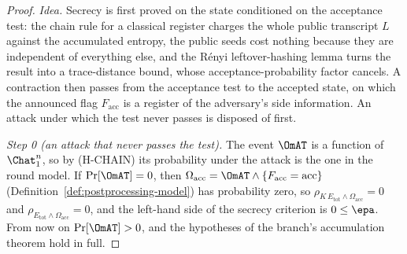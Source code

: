 \begin{proof}
\emph{Idea.} Secrecy is first proved on the state conditioned on the
acceptance test: the chain rule for a classical register charges the whole
public transcript $L$ against the accumulated entropy, the public seeds cost
nothing because they are independent of everything else, and the R\'enyi
leftover-hashing lemma turns the result into a trace-distance bound, whose
acceptance-probability factor cancels. A contraction then passes from the
acceptance test to the accepted state, on which the announced flag
$F_{\mathrm{acc}}$ is a register of the adversary's side information. An
attack under which the test never passes is disposed of first.

\emph{Step 0 (an attack that never passes the test).} The event $\OmAT$ is
a function of $\Chat_1^n$, so by (H-CHAIN) its probability under the
attack is the one in the round model. If $\Pr[\OmAT]=0$, then
$\Omega_{\mathrm{acc}}=\OmAT\wedge\{F_{\mathrm{acc}}=\mathrm{acc}\}$
(Definition~\ref{def:postprocessing-model}) has probability zero, so
$\rho_{K\,E_{\mathrm{tot}}\wedge\Omega_{\mathrm{acc}}}=0$ and
$\rho_{E_{\mathrm{tot}}\wedge\Omega_{\mathrm{acc}}}=0$, and the left-hand
side of the secrecy criterion is $0\le\epa$. From now on $\Pr[\OmAT]>0$,
and the hypotheses of the branch's accumulation theorem hold in full.


\end{proof}
